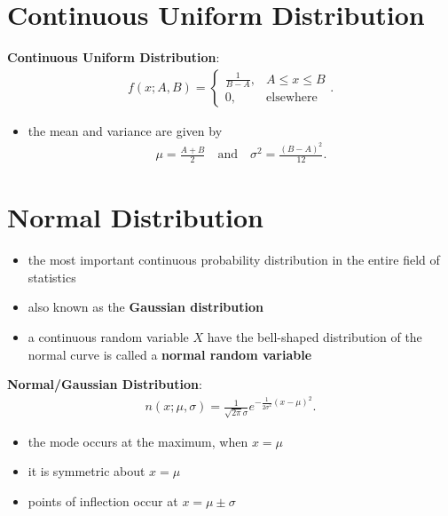 \documentclass[10pt]{article}
\begin{document}
\section{Continuous Uniform Distribution}
\begin{definition}
    \textbf{Continuous Uniform Distribution}:
    \begin{gather*}
        f(x;A,B) = \begin{cases}
            \frac{1}{B-A}, & A \le x \le B \\ 
            0, & \text{elsewhere}
        \end{cases}
    .\end{gather*}
    \begin{itemize}
        \item the mean and variance are given by 
            \begin{gather*}
                \mu = \frac{A+B}{2} \quad \text{and} \quad \sigma^2 = \frac{(B-A)^2}{12}
            .\end{gather*}
    \end{itemize}
\end{definition}

\section{Normal Distribution}
\begin{itemize}
    \item the most important continuous probability distribution in the entire field of statistics 
    \item also known as the \textbf{Gaussian distribution} 
    \item a continuous random variable $X$ have the bell-shaped distribution of the normal curve is called a \textbf{normal random variable} 
\end{itemize}
\begin{definition}
    \textbf{Normal/Gaussian Distribution}:
    \begin{gather*}
        n(x;\mu,\sigma) = \frac{1}{\sqrt{2\pi}\sigma}e^{-\frac{1}{2\sigma^2}(x-\mu)^2}
    .\end{gather*}
    \begin{itemize}
        \item the mode occurs at the maximum, when $x=\mu$
        \item it is symmetric about  $x=\mu$
        \item points of inflection occur at $x=\mu \pm \sigma$
    \end{itemize}
\end{definition}
\end{document}
